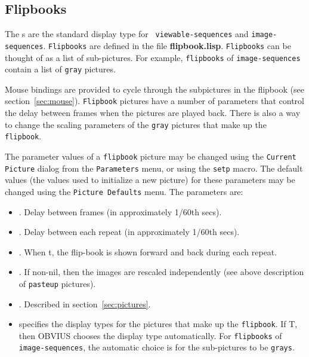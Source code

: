 
\subsection{Flipbooks}
\label{sec:flipbook}

The s are the standard display type for {\tt
viewable-sequences} and {\tt image-sequences}.  {\tt Flipbooks} are
defined in the file {\bf flipbook.lisp}.  {\tt Flipbooks} can be
thought of as a list of sub-pictures.  For example, {\tt flipbooks} of
{\tt image-sequences} contain a list of {\tt gray} pictures.

Mouse bindings are provided to cycle through the subpictures in the
flipbook (see section~\ref{sec:mouse}).  {\tt Flipbook} pictures have
a number of parameters that control the delay between frames when the
pictures are played back.  There is also a way to change the scaling
parameters of the {\tt gray} pictures that make up the {\tt flipbook}.

The parameter values of a {\tt flipbook} picture may be changed using
the {\tt Current Picture} dialog from the {\tt Parameters} menu, or
using the {\tt setp} macro.  The default values (the values used to
initialize a new picture) for these parameters may be changed using
the {\tt Picture Defaults} menu.  The parameters are:
\begin{itemize}
\item {}.  Delay between frames (in approximately
1/60th secs).

\item {}.  Delay between each repeat (in approximately
1/60th secs).

\item {}.  When t, the flip-book is shown forward
and back during each repeat.

\item {}.  If non-nil, then the images are
rescaled independently (see above description of {\tt pasteup}
pictures).

\item {}. Described in section~\ref{sec:pictures}.

\item {} specifies the display types for the
pictures that make up the {\tt flipbook}.  If T, then OBVIUS chooses
the display type automatically.  For {\tt flipbooks} of {\tt
image-sequences}, the automatic choice is for the sub-pictures to be
{\tt grays}.
\end{itemize}

